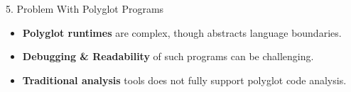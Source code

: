 \begin{roundedbeamerblock}{5. Problem With Polyglot Programs}

    \vspace{7mm}
    \begin{itemize}
        \item \textbf{Polyglot runtimes} are complex, though abstracts language boundaries.
        \vspace{8mm}
        \item \textbf{Debugging \& Readability} of such programs can be challenging.
        \vspace{8mm}
        \item \textbf{Traditional analysis} tools does not fully support polyglot code analysis.
    \end{itemize}

\end{roundedbeamerblock}